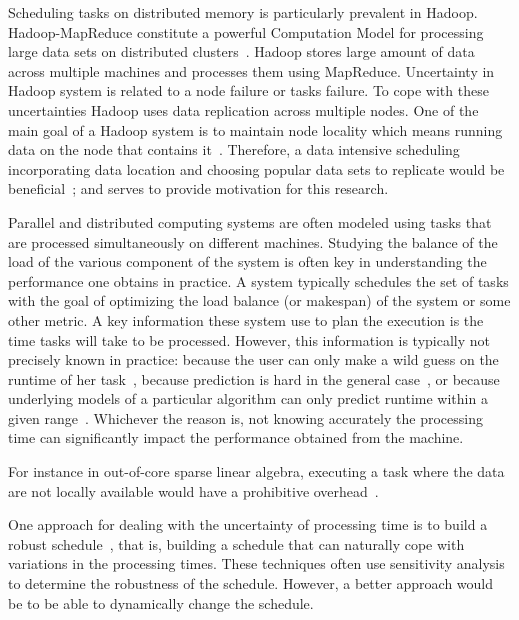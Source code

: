 \documentclass[12pt]{article}
\theoremstyle{mystyle}
\begin{document}
Scheduling tasks on distributed memory is particularly prevalent in Hadoop.  Hadoop-MapReduce constitute a powerful Computation Model for processing large data sets on distributed clusters~\cite{DBLP:journals/corr/abs-1207-0780}. Hadoop stores large amount of data across multiple machines and processes them using MapReduce. Uncertainty in  Hadoop system is related to a node failure or tasks failure. To cope with these uncertainties Hadoop uses data replication across multiple nodes.  One of the main goal of a Hadoop system is to maintain node locality which means running data on the node that contains it~\cite{Zaharia:EECS-2009-55}. Therefore, a data intensive scheduling incorporating data location  and choosing popular data sets to replicate would be beneficial~\cite{Guo:2012:IDL:2310096.2310222}; and serves to provide motivation for this research.

 \label{ch1-Scheduling}

 Parallel and distributed computing systems are often modeled using
 tasks that are processed simultaneously on different
 machines. Studying the balance of the load of the various component of
 the system is often key in understanding the performance one obtains
 in practice. A system typically schedules the set of tasks with the
 goal of optimizing the load balance (or makespan) of the system or
 some other metric. A key information these system use to plan the
 execution is the time tasks will take to be processed. However, this
 information is typically not precisely known in practice: because the
 user can only make a wild guess on the runtime of her
 task~\cite{Luong2008}, because prediction is hard in the general
 case~\cite{Wilhelm2008}, or because underlying models of a particular
 algorithm can only predict runtime within a given
 range~\cite{Erlebacher14-ICS}. Whichever the reason is, not knowing
 accurately the processing time can significantly impact the
 performance obtained from the machine.
 
 For instance in out-of-core sparse
 linear algebra, executing a task where the data are not locally
 available would have a prohibitive
 overhead~\cite{Zhou12-Cluster,Zhou12-P2S2}.
 
 One approach for dealing with the uncertainty of processing time is to
 build a robust schedule~\cite{cj09c,Gatto07,Davenport_slack-basedtechniques}, that is, building a schedule that
 can naturally cope with variations in the processing times. These
 techniques often use sensitivity analysis to determine the robustness
 of the schedule. However, a better approach would be to be able to
 dynamically change the schedule. 
 
\end{document}
